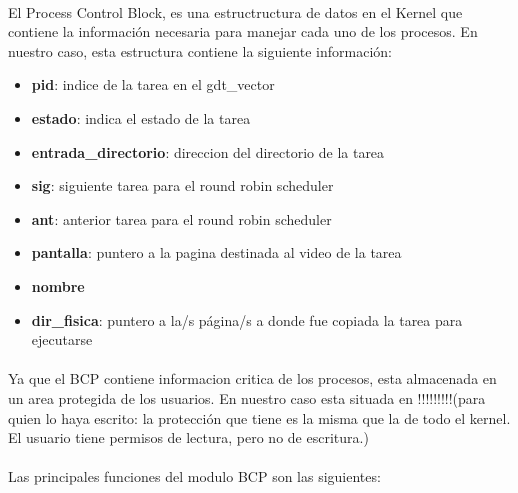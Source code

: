 \documentclass[11pt, a4paper]{article}
\begin{document}
			\paragraph{}
			El Process Control Block, es una estructructura de datos en el Kernel que contiene la información necesaria para manejar cada uno de los procesos.
			En nuestro caso, esta estructura contiene la siguiente información:
\begin{itemize}
\item \textbf{pid}: indice de la tarea en el gdt\_vector
\item \textbf{estado}: indica el estado de la tarea
\item \textbf{entrada\_directorio}: direccion del directorio de la tarea
\item \textbf{sig}: siguiente tarea para el round robin scheduler
\item \textbf{ant}: anterior tarea para el round robin scheduler
\item \textbf{pantalla}: puntero a la pagina destinada al video de la tarea
\item \textbf{nombre}
\item \textbf{dir_fisica}: puntero a la/s página/s a donde fue copiada la tarea para ejecutarse
\end{itemize}

			\paragraph{}
				Ya que el BCP contiene informacion critica de los procesos, esta almacenada en un area protegida de los usuarios. En nuestro caso esta situada en !!!!!!!!!(para quien lo haya escrito: la protección que tiene es la misma que la de todo el kernel. El usuario tiene permisos de lectura, pero no de escritura.)
		
			\paragraph{}
				Las principales funciones del modulo BCP son las siguientes:
				
\end{document}
